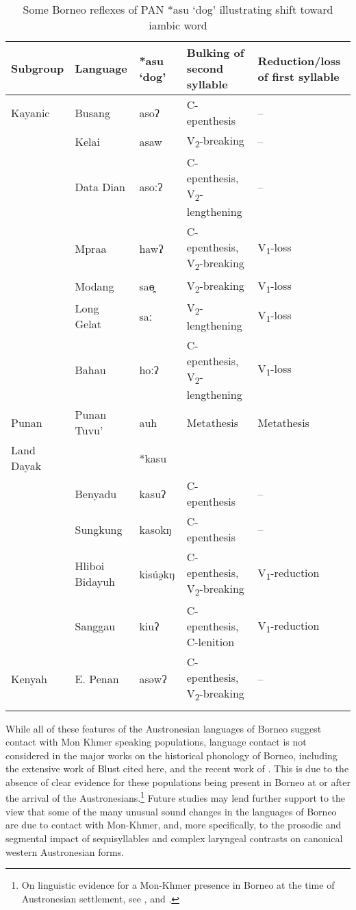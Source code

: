 \documentclass[output=paper]{langscibook}
\begin{document}
\begin{table}[t]
\begin{tabularx}{\textwidth}{QllQQ}
\lsptoprule
{Subgroup} & {Language} & {*asu ‘dog’} & {Bulking of second syllable} & {Reduction/loss of first syllable}\\
\midrule
{Kayanic} & {Busang} & asoʔ & {C-epenthesis} & {--}\\
& {Kelai} & asaw & {V\textsubscript{2}-breaking} & {--}\\
& {Data Dian} & asoːʔ & {C-epenthesis,} \mbox{{V\textsubscript{2}-lengthening}} & {--}\\
& {Mpraa} & hawʔ & {C-epenthesis,} {V\textsubscript{2}-breaking} & {V\textsubscript{1}-loss}\\
& {Modang} & saɵ̯ & {V\textsubscript{2}-breaking} & {V\textsubscript{1}-loss}\\
& {Long Gelat} & saː & \mbox{{V\textsubscript{2}-lengthening}} & {V\textsubscript{1}-loss}\\
& {Bahau} & hoːʔ & {C-epenthesis,} \mbox{{V\textsubscript{2}-lengthening}} & {V\textsubscript{1}-loss}\\
\midrule
{Punan} & {Punan Tuvu’} & {auh} & {Metathesis} & {Metathesis}\\
\midrule
{Land Dayak} &  & {*kasu} &  & \\
& {Benyadu} & kasuʔ & {C-epenthesis} & {--}\\
& {Sungkung} & kasokŋ & {C-epenthesis} & {--}\\
& {Hliboi Bidayuh} & kisúə̯kŋ & {C-epenthesis,}  {V\textsubscript{2}-breaking} & {V\textsubscript{1}-reduction}\\
& {Sanggau} & {kiu}ʔ & {C-epenthesis,} {C-lenition} & {V\textsubscript{1}-reduction}\\
\midrule
{Kenyah} & {E. Penan} & asəwʔ & {C-epenthesis,} {V\textsubscript{2}-breaking} & {--}\\
\lspbottomrule
\end{tabularx}
{\caption{\label{tab:blevins:15} Some Borneo reflexes of PAN *asu ‘dog’ illustrating shift toward iambic word}}
\end{table}

While all of these features of the Austronesian languages of Borneo suggest contact with Mon Khmer speaking populations, language contact is not considered in the major works on the historical phonology of Borneo, including the extensive work of Blust cited here, and the recent work of \citet{Smith2017}. This is due to the absence of clear evidence for these populations being present in Borneo at or after the arrival of the Austronesians.\footnote{On linguistic evidence for a Mon-Khmer presence in Borneo at the time of Austronesian settlement, see \citet{Adelaar1995}, \citet{Blench2010} and \citet{BlevinsKaufman2023}.} Future studies may lend further support to the view that some of the many unusual sound changes in the languages of Borneo are due to contact with Mon-Khmer, and, more specifically, to the prosodic and segmental impact of sequisyllables and complex laryngeal contrasts on canonical western Austronesian forms. 
\end{document}
